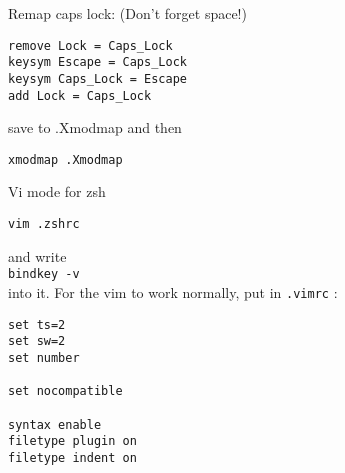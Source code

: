 \documentclass[10pt,a5paper,twoside]{memoir}
\begin{document}
Remap caps lock: (Don't forget space!)
\begin{lstlisting}
remove Lock = Caps_Lock
keysym Escape = Caps_Lock
keysym Caps_Lock = Escape
add Lock = Caps_Lock
\end{lstlisting}
save to .Xmodmap and then
\begin{lstlisting}
xmodmap .Xmodmap
\end{lstlisting}
Vi mode for zsh
\begin{lstlisting}
vim .zshrc
\end{lstlisting}
and write\\
\texttt{bindkey -v}\\
into it.
For the vim to work normally, put in \texttt{.vimrc} :
\begin{lstlisting}
set ts=2
set sw=2
set number

set nocompatible

syntax enable
filetype plugin on
filetype indent on
\end{lstlisting}













\newpage
\tableofcontents
\printindex[cpp]
\printindex[theory]
\printindex[git]
\printindex[makefile]
\end{document}
